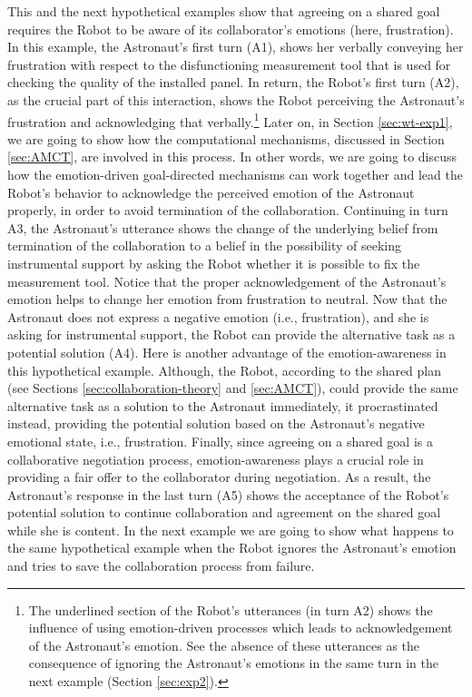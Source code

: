 This and the next hypothetical examples show that agreeing on a shared goal
requires the Robot to be aware of its collaborator's emotions (here,
frustration). In this example, the Astronaut's first turn (A1), shows her
verbally conveying her frustration with respect to the disfunctioning
measurement tool that is used for checking the quality of the installed panel.
In return, the Robot's first turn (A2), as the crucial part of this interaction,
shows the Robot perceiving the Astronaut's frustration and acknowledging that
verbally.\footnote{The underlined section of the Robot's utterances (in turn A2)
shows the influence of using emotion-driven processes which leads to
acknowledgement of the Astronaut's emotion. See the absence of these utterances
as the consequence of ignoring the Astronaut's emotions in the same turn in the
next example (Section \ref{sec:exp2}).} Later on, in Section \ref{sec:wt-exp1},
we are going to show how the computational mechanisms, discussed in Section
\ref{sec:AMCT}, are involved in this process. In other words, we are going to
discuss how the emotion-driven goal-directed mechanisms can work together and
lead the Robot's behavior to acknowledge the perceived emotion of the Astronaut
properly, in order to avoid termination of the collaboration. Continuing in turn
A3, the Astronaut's utterance shows the change of the underlying belief from
termination of the collaboration to a belief in the possibility of seeking
instrumental support by asking the Robot whether it is possible to fix the
measurement tool. Notice that the proper acknowledgement of the Astronaut's
emotion helps to change her emotion from frustration to neutral. Now that the
Astronaut does not express a negative emotion (i.e., frustration), and she is
asking for instrumental support, the Robot can provide the alternative task as a
potential solution (A4). Here is another advantage of the emotion-awareness in
this hypothetical example. Although, the Robot, according to the shared plan
(see Sections \ref{sec:collaboration-theory} and \ref{sec:AMCT}), could provide
the same alternative task as a solution to the Astronaut immediately, it
procrastinated instead, providing the potential solution based on the
Astronaut's negative emotional state, i.e., frustration. Finally, since agreeing
on a shared goal is a collaborative negotiation process, emotion-awareness plays
a crucial role in providing a fair offer to the collaborator during negotiation.
As a result, the Astronaut's response in the last turn (A5) shows the acceptance
of the Robot's potential solution to continue collaboration and agreement on the
shared goal while she is content. In the next example we are going to show what
happens to the same hypothetical example when the Robot ignores the Astronaut's
emotion and tries to save the collaboration process from failure.\\

